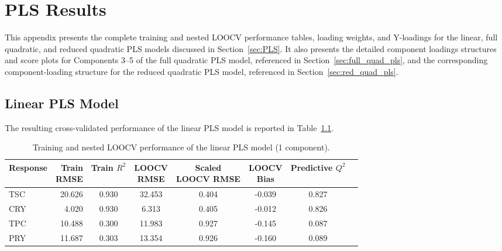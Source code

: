 \documentclass[MScDSA]{uccthesis}
\begin{document}
\chapter{PLS Results}
\label{app:pls_model}
This appendix presents the complete training and nested LOOCV performance tables, loading weights, and Y-loadings for the linear, full quadratic, and reduced quadratic PLS models discussed in Section~\ref{sec:PLS}. It also presents the detailed component loadings structures and score plots for Components 3--5 of the full quadratic PLS model, referenced in Section~\ref{sec:full_quad_pls}, and the corresponding component-loading structure for the reduced quadratic PLS model, referenced in Section~\ref{sec:red_quad_pls}.

\section{Linear PLS Model}
The resulting cross-validated performance of the linear PLS model is reported in Table~\ref{tab:linear_model_performance}.

\begin{table}[H]
\centering
\fontsize{10}{12}\selectfont
\setlength{\tabcolsep}{4pt}
\caption{Training and nested LOOCV performance of the linear PLS model (1 component).}
\label{tab:linear_model_performance}
\begin{tabular}{lrcccccr}
\toprule
\textbf{Response} & \makecell{\textbf{Train}\\\textbf{RMSE}} & \makecell{\textbf{Train}\\\textbf{$R^2$}} & \makecell{\textbf{LOOCV}\\\textbf{RMSE}} & \makecell{\textbf{Scaled}\\\textbf{LOOCV RMSE}} & \makecell{\textbf{LOOCV}\\\textbf{Bias}} & \makecell{\textbf{Predictive}\\\textbf{$Q^2$}} \\
\midrule
TSC & 20.626 & 0.930 & 32.453 & 0.404 & -0.039 & 0.827 \\
CRY & 4.020 & 0.930 & 6.313 & 0.405 & -0.012 & 0.826 \\
TPC & 10.488 & 0.300 & 11.983 & 0.927 & -0.145 & 0.087 \\
PRY & 11.687 & 0.303 & 13.354 & 0.926 & -0.160 & 0.089 \\
\bottomrule
\end{tabular}
\end{table}
\end{document}

